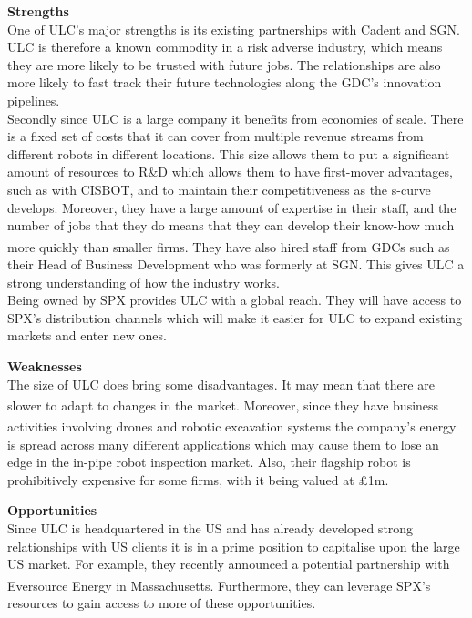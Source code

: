 \documentclass[11pt]{article}		%
\newcommand{\supercite}[1]{\textsuperscript{\cite{#1}}}		%
\begin{document}
	        \textbf{Strengths}
	        \\
	        One of ULC's major strengths is its existing partnerships with Cadent and SGN. ULC is therefore a known commodity in a risk adverse industry, which means they are more likely to be trusted with future jobs. The relationships are also more likely to fast track their future technologies along the GDC's innovation pipelines. 
	        \\
            \hspace*{2ex}Secondly since ULC is a large company it benefits from economies of scale. There is a fixed set of costs that it can cover from multiple revenue streams from different robots in different locations. This size allows them to put a significant amount of resources to R\&D which allows them to have first-mover advantages, such as with CISBOT, and to maintain their competitiveness as the s-curve develops. Moreover, they have a large amount of expertise in their staff, and the number of jobs that they do means that they can develop their know-how much more quickly than smaller firms\supercite{Barney}.
	        They have also hired staff from GDCs  such as their Head of Business Development who was formerly at SGN. This gives ULC a strong understanding of how the industry works.
	        \\
            \hspace*{2ex}Being owned by SPX provides ULC with a global reach. They will have access to SPX's distribution channels which will make it easier for ULC to expand existing markets and enter new ones.
	        
	        \textbf{Weaknesses}
	        \\
	        The size of ULC does bring some disadvantages. It may mean that there are slower to adapt to changes in the market\supercite{ULC_Slow}. Moreover, since they have business activities involving drones and robotic excavation systems\supercite{ULC_news} the company's energy is spread across many different applications which may cause them to lose an edge in the in-pipe robot inspection market. Also, their flagship robot is prohibitively expensive for some firms, with it being valued at £1m.
	        
	        \textbf{Opportunities}
	        \\
	        Since ULC is headquartered in the US and has already developed strong relationships with US clients it is in a prime position to capitalise upon the large US market. For example, they recently announced a potential partnership with Eversource Energy in Massachusetts\supercite{ULC_news}. Furthermore, they can leverage SPX's resources to gain access to more of these opportunities.
	        
\end{document}
